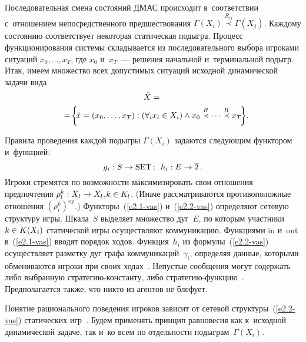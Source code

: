 \begin{multicols}{2}
    \smallskip
    
    Последовательная смена состояний ДМАС происходит в~соответствии 
с~отношением непосредственного предшествования $\Gamma(X_i) 
\overset{R_{ij}}{\prec} \Gamma(X_j)$. Каж\-до\-му со\-сто\-янию соответствует некоторая 
\mbox{статическая} подыгра. Процесс функционирования сис\-те\-мы складывается из 
последовательного выбора игроками ситуаций $x_0, \ldots , x_T$, где  
$x_0$ и~$x_T$~--- решения начальной и~терминальной подыгр. Итак, имеем 
множество всех допустимых ситуаций исходной динамической задачи вида
 \begin{multline*}
    \tilde{X} ={}\\
    {}=\!\left\{\! \tilde{x} =\left( x_0, \ldots , x_T\right): \left( \forall_i x_i\in 
X_i\right) \wedge x_0\overset{R}{\prec} \cdots \overset{R}{\prec} x_T\!\right\}\!.\hspace*{-5.73415pt}
    \end{multline*}
    
    Правила проведения каждой подыгры $\Gamma(X_i)$ задаются сле\-ду\-ющим 
функтором и~функ\-цией: 
    \begin{equation}
    g_i: S\to \mathrm{SET}\,;\enskip h_i: E\to \overline{2}\,.
    \label{e2.2-vas}
    \end{equation}
Игроки стремятся по возможности максимизировать свои отношения предпочтения 
$\rho_l^k: X_l\hm\to X_l$,\linebreak $k\hm\in K_l$. (Иначе рас\-смат\-ри\-ва\-ют\-ся противоположные 
отношения $(\rho_i^k)^{\mathrm{op}}$.) Функторы~(\ref{e2.1-vas}) и~(\ref{e2.2-vas}) 
опре\-де\-ля\-ют сетевую структуру игры. Шкала~$S$ выделяет множество дуг~$E$, по 
которым участники\linebreak $k\hm\in K(X_i)$ статической игры осуществляют 
коммуникацию. Функциями in и~out в~(\ref{e2.1-vas}) вводят порядок ходов. 
Функция~$h_i$ из формулы~(\ref{e2.2-vas}) осуществляет разметку дуг графа 
коммуникаций~$\gamma_i$, определяя данные, которыми обмениваются игроки при 
своих ходах~\cite{5-vas}. Не\-пус\-тые сообщения могут содержать либо выбранную 
стра\-те\-гию-конс\-тан\-ту, либо стра\-те\-гию-функ\-цию~\cite{1-vas, 5-vas}. 
Предполагается так\-же, что никто из агентов не блефует. 
    
    Понятие рационального поведения игроков зависит от сетевой 
структуры~(\ref{e2.2-vas}) статических игр~\cite{5-vas, 12-vas, 13-vas}. Будем 
применять принцип равновесия как к~исходной динамической задаче, так и~ко всем 
по отдельности подыграм~$\Gamma(X_i)$.
    

\end{multicols}
